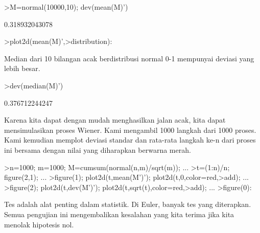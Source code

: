 \documentclass[a4paper,10pt]{article}
\begin{document}
\begin{eulernotebook}
\begin{eulercomment}
\begin{eulercomment}
\begin{eulercomment}
\end{eulercomment}
\begin{eulerprompt}
>M=normal(10000,10); dev(mean(M)')
\end{eulerprompt}
\begin{euleroutput}
  0.318932043078
\end{euleroutput}
\begin{eulerprompt}
>plot2d(mean(M)',>distribution):
\end{eulerprompt}
\begin{eulercomment}
Median dari 10 bilangan acak berdistribusi normal 0-1 mempunyai
deviasi yang lebih besar.
\end{eulercomment}
\begin{eulerprompt}
>dev(median(M)')
\end{eulerprompt}
\begin{euleroutput}
  0.376712244247
\end{euleroutput}
\begin{eulercomment}
Karena kita dapat dengan mudah menghasilkan jalan acak, kita dapat
mensimulasikan proses Wiener. Kami mengambil 1000 langkah dari 1000
proses. Kami kemudian memplot deviasi standar dan rata-rata langkah
ke-n dari proses ini bersama dengan nilai yang diharapkan berwarna
merah.
\end{eulercomment}
\begin{eulerprompt}
>n=1000; m=1000; M=cumsum(normal(n,m)/sqrt(m)); ...
>t=(1:n)/n; figure(2,1); ...
>figure(1); plot2d(t,mean(M')'); plot2d(t,0,color=red,>add); ...
>figure(2); plot2d(t,dev(M')'); plot2d(t,sqrt(t),color=red,>add); ...
>figure(0):
\end{eulerprompt}
\begin{eulercomment}
Tes adalah alat penting dalam statistik. Di Euler, banyak tes yang
diterapkan. Semua pengujian ini mengembalikan kesalahan yang kita
terima jika kita menolak hipotesis nol.


\end{eulercomment}
\end{eulercomment}
\end{eulercomment}
\end{eulernotebook}
\end{document}
